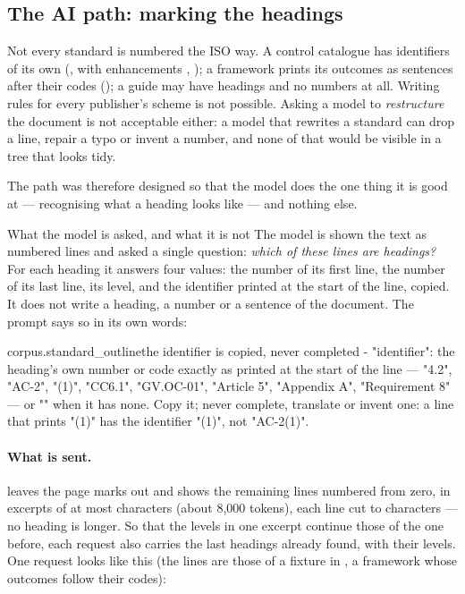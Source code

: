 \subsection{The AI path: marking the headings}\label{sec:corpus:outline}

Not every standard is numbered the ISO way. A control catalogue has identifiers of its own
(, with enhancements , ); a framework prints its outcomes as
sentences after their codes (); a guide may have headings and no numbers at
all. Writing rules for every publisher's scheme is not possible. Asking a model to
\emph{restructure} the document is not acceptable either: a model that rewrites a standard
can drop a line, repair a typo or invent a number, and none of that would be visible in a
tree that looks tidy.

The path was therefore designed so that the model does the one thing it is good at ---
recognising what a heading looks like --- and nothing else.

\begin{aibox}{What the model is asked, and what it is not}
The model is shown the text as numbered lines and asked a single question: \emph{which of
these lines are headings?} For each heading it answers four values: the number of its first
line, the number of its last line, its level, and the identifier printed at the start of the
line, copied. It does not write a heading, a number or a sentence of the document. The
prompt says so in its own words:
\begin{promptexcerpt}{corpus.standard_outline}{the identifier is copied, never completed}
- "identifier": the heading's own number or code exactly as printed at the
  start of the line — "4.2", "AC-2", "(1)", "CC6.1", "GV.OC-01", "Article 5",
  "Appendix A", "Requirement 8" — or "" when it has none. Copy it; never
  complete, translate or invent one: a line that prints "(1)" has the
  identifier "(1)", not "AC-2(1)".
\end{promptexcerpt}
\end{aibox}

\paragraph{What is sent.}  leaves the page marks out and shows the remaining
lines numbered from zero, in excerpts of at most  characters
(about 8,000 tokens), each line cut to  characters --- no heading
is longer. So that the levels in one excerpt continue those of the one before, each request
also carries the last  headings already found, with their levels.
One request looks like this (the lines are those of a fixture in
, a framework whose outcomes follow their codes):

